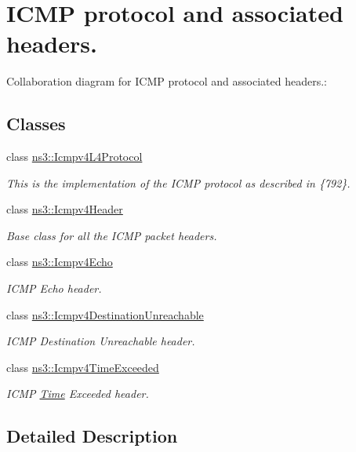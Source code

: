 \hypertarget{group__icmp}{}\section{I\+C\+MP protocol and associated headers.}
\label{group__icmp}
Collaboration diagram for I\+C\+MP protocol and associated headers.\+:
\subsection*{Classes}
\begin{DoxyCompactItemize}
\item 
class \hyperlink{classns3_1_1Icmpv4L4Protocol}{ns3\+::\+Icmpv4\+L4\+Protocol}
\begin{DoxyCompactList}\small\item\em This is the implementation of the I\+C\+MP protocol as described in \{792\}. \end{DoxyCompactList}\item 
class \hyperlink{classns3_1_1Icmpv4Header}{ns3\+::\+Icmpv4\+Header}
\begin{DoxyCompactList}\small\item\em Base class for all the I\+C\+MP packet headers. \end{DoxyCompactList}\item 
class \hyperlink{classns3_1_1Icmpv4Echo}{ns3\+::\+Icmpv4\+Echo}
\begin{DoxyCompactList}\small\item\em I\+C\+MP Echo header. \end{DoxyCompactList}\item 
class \hyperlink{classns3_1_1Icmpv4DestinationUnreachable}{ns3\+::\+Icmpv4\+Destination\+Unreachable}
\begin{DoxyCompactList}\small\item\em I\+C\+MP Destination Unreachable header. \end{DoxyCompactList}\item 
class \hyperlink{classns3_1_1Icmpv4TimeExceeded}{ns3\+::\+Icmpv4\+Time\+Exceeded}
\begin{DoxyCompactList}\small\item\em I\+C\+MP \hyperlink{classns3_1_1Time}{Time} Exceeded header. \end{DoxyCompactList}\end{DoxyCompactItemize}


\subsection{Detailed Description}
